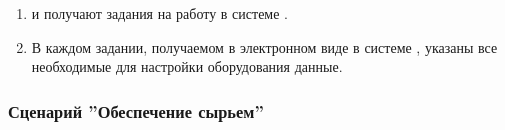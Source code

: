 \begin{enumerate}
\item \gaoperator и \operator получают задания на работу в системе \gofro. %
\item 	В каждом задании, получаемом в электронном виде в системе \gofro,  указаны все необходимые для настройки оборудования данные.
\end{enumerate}


\subsubsection{Сценарий ''Обеспечение сырьем''}
\label{bp:production_4}


